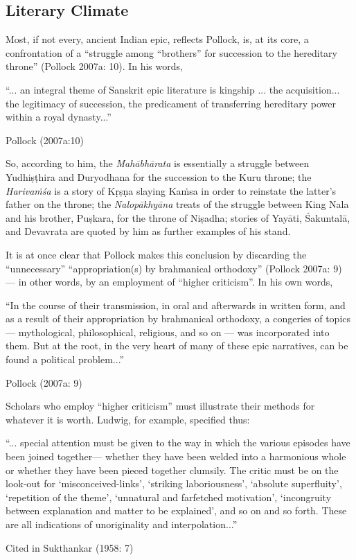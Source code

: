 \subsection{Literary Climate}\label{sec1.1.1}

Most, if not every, ancient Indian epic, reflects Pollock, is, at its core, a confrontation of a “struggle among “brothers” for succession to the hereditary throne” (Pollock 2007a: 10).  In his words, 

\begin{myquote}
“... an integral theme of Sanskrit epic literature is kingship ... the acquisition... the legitimacy of succession, the predicament of transferring hereditary power within a royal dynasty...”

\hfill Pollock (2007a:10)
\end{myquote}

So, according to him, the {\sl Mahābhārata} is essentially a struggle between Yudhiṣṭhira and Duryodhana for the succession to the Kuru throne; the {\sl Harivaṁśa} is a story of Kṛṣṇa slaying Kaṁsa in order to reinstate the latter’s father on the throne; the {\sl Nalopākhyāna} treats of the struggle between King Nala and his brother, Puṣkara, for the throne of Niṣadha; stories of Yayāti, Śakuntalā, and Devavrata are quoted by him as further examples of his stand. 

It is at once clear that Pollock makes this conclusion by discarding the “unnecessary” “appropriation(s) by brahmanical orthodoxy” (Pollock 2007a: 9) --- in other words, by an employment of “higher criticism”. In his own words, 

\begin{myquote}
“In the course of their transmission, in oral and afterwards in written form, and as a result of their appropriation by brahmanical orthodoxy, a congeries of topics --- mythological, philosophical, religious, and so on --- was incorporated into them. But at the root, in the very heart of many of these epic narratives, can be found a political problem...”	

\hfill Pollock (2007a: 9)
\end{myquote}

Scholars who employ “higher criticism” must illustrate their methods for whatever it is worth. Ludwig, for example, specified thus:

\begin{myquote}
“... special attention must be given to the way in which the various episodes have been joined together— whether they have been welded into a harmonious whole or whether they have been pieced together clumsily. The critic must be on the look-out for ‘misconceived-links’, ‘striking laboriousness’, ‘absolute superfluity’, ‘repetition of the theme’, ‘unnatural and farfetched motivation’, ‘incongruity between explanation and matter to be explained’, and so on and so forth. These are all indications of unoriginality and interpolation...”	

\hfill Cited in Sukthankar (1958: 7)
\end{myquote}

